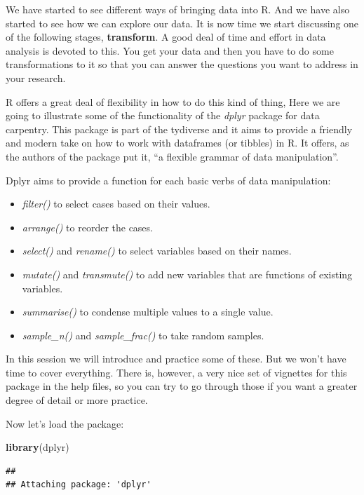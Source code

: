 \documentclass[]{book}
\newenvironment{Shaded}{\begin{snugshade}}{\end{snugshade}}
\newcommand{\KeywordTok}[1]{\textcolor[rgb]{0.13,0.29,0.53}{\textbf{#1}}}
\newcommand{\NormalTok}[1]{#1}
\providecommand{\tightlist}{%
  \setlength{\itemsep}{0pt}\setlength{\parskip}{0pt}}
\theoremstyle{definition}
\theoremstyle{definition}
\theoremstyle{definition}
\theoremstyle{remark}
\begin{document}
We have started to see different ways of bringing data into R. And we
have also started to see how we can explore our data. It is now time we
start discussing one of the following stages, \textbf{transform}. A good
deal of time and effort in data analysis is devoted to this. You get
your data and then you have to do some transformations to it so that you
can answer the questions you want to address in your research.

R offers a great deal of flexibility in how to do this kind of thing,
Here we are going to illustrate some of the functionality of the
\emph{dplyr} package for data carpentry. This package is part of the
tydiverse and it aims to provide a friendly and modern take on how to
work with dataframes (or tibbles) in R. It offers, as the authors of the
package put it, ``a flexible grammar of data manipulation''.

Dplyr aims to provide a function for each basic verbs of data
manipulation:

\begin{itemize}
\tightlist
\item
  \emph{filter()} to select cases based on their values.
\item
  \emph{arrange()} to reorder the cases.
\item
  \emph{select()} and \emph{rename()} to select variables based on their
  names.
\item
  \emph{mutate()} and \emph{transmute()} to add new variables that are
  functions of existing variables.
\item
  \emph{summarise()} to condense multiple values to a single value.
\item
  \emph{sample\_n()} and \emph{sample\_frac()} to take random samples.
\end{itemize}

In this session we will introduce and practice some of these. But we
won't have time to cover everything. There is, however, a very nice set
of vignettes for this package in the help files, so you can try to go
through those if you want a greater degree of detail or more practice.

Now let's load the package:

\begin{Shaded}
\begin{Highlighting}[]
\KeywordTok{library}\NormalTok{(dplyr)}
\end{Highlighting}
\end{Shaded}

\begin{verbatim}
## 
## Attaching package: 'dplyr'
\end{verbatim}
\end{document}
